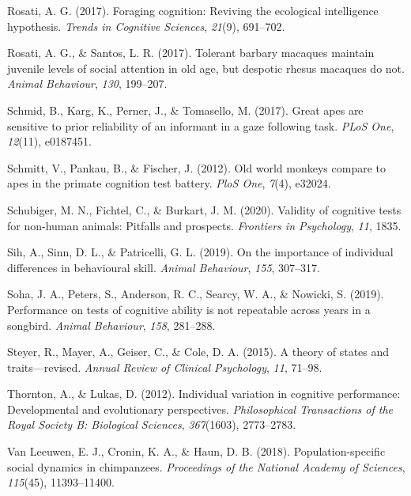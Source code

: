 \documentclass[
  man,floatsintext]{apa6}
\newlength{\cslhangindent}
\newenvironment{CSLReferences}[2] %
 {\begin{list}{}{%
  \setlength{\itemindent}{0pt}
  \setlength{\leftmargin}{0pt}
  \setlength{\parsep}{0pt}
  \ifodd #1
   \setlength{\leftmargin}{\cslhangindent}
   \setlength{\itemindent}{-1\cslhangindent}
  \fi
  \setlength{\itemsep}{#2\baselineskip}}}
 {\end{list}}
\begin{document}
\begin{CSLReferences}{1}{0}
Rosati, A. G. (2017). Foraging cognition: Reviving the ecological intelligence hypothesis. \emph{Trends in Cognitive Sciences}, \emph{21}(9), 691--702.

Rosati, A. G., \& Santos, L. R. (2017). Tolerant barbary macaques maintain juvenile levels of social attention in old age, but despotic rhesus macaques do not. \emph{Animal Behaviour}, \emph{130}, 199--207.

Schmid, B., Karg, K., Perner, J., \& Tomasello, M. (2017). Great apes are sensitive to prior reliability of an informant in a gaze following task. \emph{PLoS One}, \emph{12}(11), e0187451.

Schmitt, V., Pankau, B., \& Fischer, J. (2012). Old world monkeys compare to apes in the primate cognition test battery. \emph{PloS One}, \emph{7}(4), e32024.

Schubiger, M. N., Fichtel, C., \& Burkart, J. M. (2020). Validity of cognitive tests for non-human animals: Pitfalls and prospects. \emph{Frontiers in Psychology}, \emph{11}, 1835.

Sih, A., Sinn, D. L., \& Patricelli, G. L. (2019). On the importance of individual differences in behavioural skill. \emph{Animal Behaviour}, \emph{155}, 307--317.

Soha, J. A., Peters, S., Anderson, R. C., Searcy, W. A., \& Nowicki, S. (2019). Performance on tests of cognitive ability is not repeatable across years in a songbird. \emph{Animal Behaviour}, \emph{158}, 281--288.

Steyer, R., Mayer, A., Geiser, C., \& Cole, D. A. (2015). A theory of states and traits---revised. \emph{Annual Review of Clinical Psychology}, \emph{11}, 71--98.

Thornton, A., \& Lukas, D. (2012). Individual variation in cognitive performance: Developmental and evolutionary perspectives. \emph{Philosophical Transactions of the Royal Society B: Biological Sciences}, \emph{367}(1603), 2773--2783.

Van Leeuwen, E. J., Cronin, K. A., \& Haun, D. B. (2018). Population-specific social dynamics in chimpanzees. \emph{Proceedings of the National Academy of Sciences}, \emph{115}(45), 11393--11400.


\end{CSLReferences}
\end{document}
